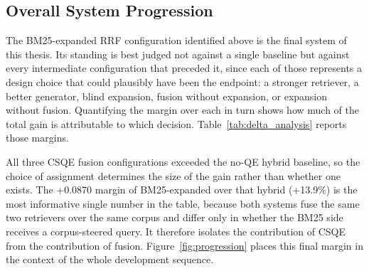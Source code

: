 \subsection{Overall System Progression}
\label{sec:res_progression}

The BM25-expanded RRF configuration identified above is the final system of this thesis. Its standing is best judged not against a single baseline but against every intermediate configuration that preceded it, since each of those represents a design choice that could plausibly have been the endpoint: a stronger retriever, a better generator, blind expansion, fusion without expansion, or expansion without fusion. Quantifying the margin over each in turn shows how much of the total gain is attributable to which decision. Table~\ref{tab:delta_analysis} reports those margins.

\begin{table}[htbp]
    \centering
    \caption[NDCG@10 gains of BM25-expanded RRF over prior systems]{NDCG@10 improvements of BM25-expanded RRF over prior systems.}
    \label{tab:delta_analysis}
\end{table}

All three CSQE fusion configurations exceeded the no-QE hybrid baseline, so the choice of assignment determines the size of the gain rather than whether one exists. The +0.0870 margin of BM25-expanded over that hybrid (+13.9\%) is the most informative single number in the table, because both systems fuse the same two retrievers over the same corpus and differ only in whether the BM25 side receives a corpus-steered query. It therefore isolates the contribution of CSQE from the contribution of fusion. Figure~\ref{fig:progression} places this final margin in the context of the whole development sequence.

